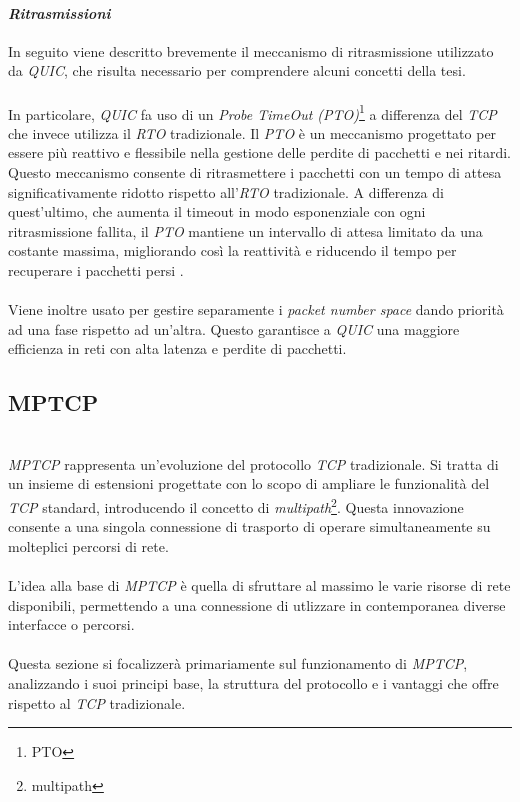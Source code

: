 \paragraph{\textit{Ritrasmissioni}}
\noindent In seguito viene descritto brevemente il meccanismo di ritrasmissione utilizzato da \emph{QUIC}, che risulta necessario per comprendere alcuni concetti della tesi.
\\\\
In particolare, \emph{QUIC} fa uso di un \emph{Probe TimeOut (PTO)}\footnote{\gls{PTO}} a differenza del \emph{TCP} che invece utilizza il \emph{RTO} tradizionale.
Il \emph{PTO} è un meccanismo progettato per essere più reattivo e flessibile nella gestione delle perdite di pacchetti e nei ritardi.
Questo meccanismo consente di ritrasmettere i pacchetti con un tempo di attesa significativamente ridotto rispetto all'\emph{RTO} tradizionale.
A differenza di quest'ultimo, che aumenta il timeout in modo esponenziale con ogni ritrasmissione fallita, il \emph{PTO} mantiene un intervallo di attesa limitato da una costante massima, migliorando così la reattività e riducendo il tempo per recuperare i pacchetti persi \cite{site:pto-quic}.
\\\\
Viene inoltre usato per gestire separamente i \emph{packet number space} dando priorità ad una fase rispetto ad un'altra. 
Questo garantisce a \emph{QUIC} una maggiore efficienza in reti con alta latenza e perdite di pacchetti.
\subsection{MPTCP}
~\\
\indent \emph{MPTCP} rappresenta un'evoluzione del protocollo \emph{TCP} tradizionale. 
Si tratta di un insieme di estensioni progettate con lo scopo di ampliare le funzionalità del \emph{TCP} standard,
introducendo il concetto di \emph{multipath}\footnote{\gls{multipath}}. Questa innovazione consente a una singola connessione di trasporto di operare simultaneamente su molteplici percorsi di rete.
\\\\
L'idea alla base di \emph{MPTCP} è quella di sfruttare al massimo le varie risorse di rete disponibili, permettendo a una connessione di utlizzare in contemporanea diverse interfacce o percorsi.
\\\\
Questa sezione si focalizzerà primariamente sul funzionamento di \emph{MPTCP}, analizzando i suoi principi base, la struttura del protocollo e i vantaggi che offre rispetto al \emph{TCP} tradizionale. 

